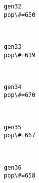 \documentclass[11pt]{article}
\begin{document}
    \begin{Verbatim}[commandchars=\\\{\}]
gen32
pop\#=650

    \end{Verbatim}

    \begin{center}
    \end{center}
    { \hspace*{\fill} \\}
    
    \begin{Verbatim}[commandchars=\\\{\}]
gen33
pop\#=619

    \end{Verbatim}

    \begin{center}
    \end{center}
    { \hspace*{\fill} \\}
    
    \begin{Verbatim}[commandchars=\\\{\}]
gen34
pop\#=670

    \end{Verbatim}

    \begin{center}
    \end{center}
    { \hspace*{\fill} \\}
    
    \begin{Verbatim}[commandchars=\\\{\}]
gen35
pop\#=667

    \end{Verbatim}

    \begin{center}
    \end{center}
    { \hspace*{\fill} \\}
    
    \begin{Verbatim}[commandchars=\\\{\}]
gen36
pop\#=658

    \end{Verbatim}
\end{document}
